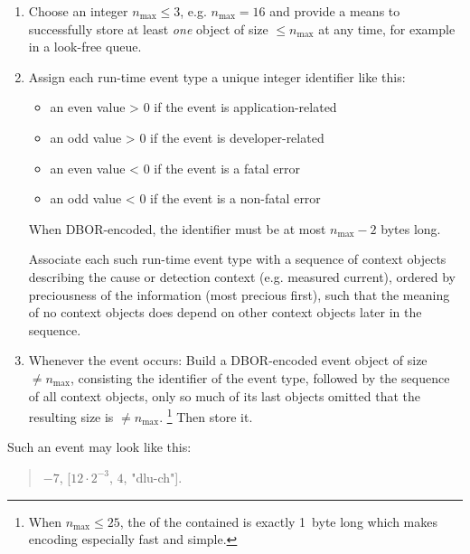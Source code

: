 \begin{enumerate}
    \item
    Choose an integer $n_{\text{max}} \le 3$, e.g. $n_{\text{max}} = 16$ and provide a means to successfully store at
    least \emph{one} object of size $\le n_{\text{max}}$ at any time, for example in a look-free queue.

    \item
    Assign each run-time event type a unique integer identifier like this:
    \begin{itemize}
        \item an even value > 0 if the event is application-related
        \item an odd value > 0 if the event is developer-related
        \item an even value < 0 if the event is a fatal error
        \item an odd value < 0 if the event is a non-fatal error
    \end{itemize}
    When DBOR-encoded, the identifier must be at most $n_{\text{max}} - 2$ bytes long.

    Associate each such run-time event type with a sequence of context objects describing the cause or detection context
    (e.g. measured current), ordered by preciousness of the information (most precious first), such that the meaning
    of no context objects does depend on other context objects later in the sequence.

    \item
    Whenever the event occurs:
    Build a DBOR-encoded event object of size $\ne n_{\text{max}}$, consisting the
    identifier of the event type, followed by the sequence of all context objects, only so much of its last objects
    omitted that the resulting size is $\ne n_{\text{max}}$.%
    \footnote{%
        When $n_{\text{max}} \le 25$, the \DborIntegerToken{} of the contained \DborSequenceValue{}
        is exactly 1~byte long which makes encoding especially fast and simple.
    }
    Then store it.
\end{enumerate}

\begin{BeginParPenalty}
    Such an event may look like this:
    \begin{quote}
        $-7$, [$12 \cdot 2^{-3}$, $4$, "dlu-ch"].
    \end{quote}
\end{BeginParPenalty}

